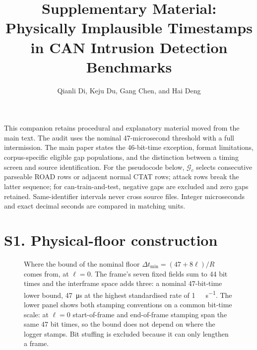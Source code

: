 \documentclass[journal,onecolumn]{IEEEtran}
\begin{document}
\title{Supplementary Material: Physically Implausible Timestamps in CAN Intrusion Detection Benchmarks}
\author{Qianli Di, Keju Du, Gang Chen, and Hai Deng}
\maketitle
This companion retains procedural and explanatory material moved from the main text.
The audit uses the nominal 47-microsecond threshold with a full intermission. The main
paper states the 46-bit-time exception, format limitations, corpus-specific eligible
gap populations, and the distinction between a timing screen and source identification.
For the pseudocode below, $\mathcal G_c$ selects consecutive parseable ROAD rows or
adjacent normal CTAT rows; attack rows break the latter sequence; for can-train-and-test, negative gaps are
excluded and zero gaps retained. Same-identifier intervals never cross source files.
Integer microseconds and exact decimal seconds are compared in matching units.
\section*{S1. Physical-floor construction}
\begin{figure}[H]
\centering

\caption{Where the bound of the nominal floor $\Delta t_{\min}=(47+8\ell)/R$ comes from, at $\ell=0$. The frame's
seven fixed fields sum to 44 bit times and the interframe space adds three: a nominal
47-bit-time lower bound, \SI{47}{\micro\second} at the highest standardised rate of
\SI{1}{\mega\bit\per\second}. The lower panel shows both stamping conventions on a common
bit-time scale: at $\ell=0$ start-of-frame and end-of-frame stamping span the same 47 bit
times, so the bound does not depend on where the logger stamps. Bit stuffing is excluded
because it can only lengthen a frame.}
\label{fig:floor}
\end{figure}
\clearpage
\end{document}
